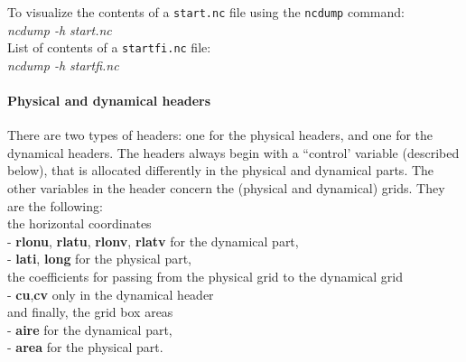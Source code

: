 To visualize the contents of a {\tt start.nc} file using the
{\tt ncdump} command:\\

\noindent
{\it ncdump -h start.nc}\\


\noindent
List of contents of a {\tt startfi.nc} file:\\

\noindent
{\it ncdump -h startfi.nc}\\





\paragraph{Physical and dynamical headers}

There are two types of headers: one for the physical headers,
and one for the dynamical headers.
The headers always begin with a ``control' variable
(described below), that is allocated differently in the physical and
dynamical parts.
The other variables in the header concern the (physical and dynamical) grids.
They are the following:\\

\noindent
the horizontal coordinates\\
- {\bf rlonu}, {\bf rlatu}, {\bf rlonv}, {\bf rlatv} for the dynamical part,\\
- {\bf lati}, {\bf long} for the physical part,\\

\noindent
the coefficients for passing from the physical grid to the dynamical grid\\
- {\bf cu},{\bf cv} only in the dynamical header\\

\noindent
and finally, the grid box areas\\
- {\bf aire} for the dynamical part,\\
- {\bf area} for the physical part.\\

